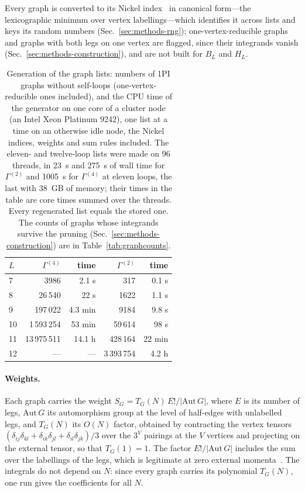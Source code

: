Every graph is converted to its Nickel index~\cite{NMB1977} in canonical form---the
lexicographic minimum over vertex labellings---which identifies it across lists and keys its random numbers
(Sec.~\ref{sec:methods-rng}); one-vertex-reducible graphs and graphs with both legs on one vertex are flagged, since
their integrands vanish (Sec.~\ref{sec:methods-construction}), and are not built for $B_L$ and $H_L$.

\begin{table}
\caption{\label{tab:generation}%
Generation of the graph lists: numbers of 1PI graphs without self-loops (one-vertex-reducible ones included), and the
CPU time of the generator on one core of a cluster node (an Intel Xeon Platinum 9242), one list at a time on an
otherwise idle node, the Nickel indices, weights and sum rules included. The eleven- and twelve-loop lists were made
on 96 threads, in 23~s and 275~s of wall time for $\Gamma^{(2)}$ and 1005~s for $\Gamma^{(4)}$ at eleven loops, the
last with 38~GB of memory; their times in the table are core times summed over the threads. Every regenerated list
equals the stored one. The counts of graphs whose integrands survive the pruning (Sec.~\ref{sec:methods-construction})
are in Table~\ref{tab:graphcounts}.}
\begin{ruledtabular}
\setlength{\tabcolsep}{3pt}\footnotesize
\begin{tabular}{lrrrr}
$L$ & $\Gamma^{(4)}$ & time & $\Gamma^{(2)}$ & time \\
\hline
7  & 3986       & 2.1 s & 317    & 0.1 s \\
8  & 26\,540    & 22 s & 1622   & 1.1 s \\
9  & 197\,022   & 4.3 min & 9184   & 9.8 s \\
10 & 1\,593\,254 & 53 min & 59\,614 & 98 s \\
11 & 13\,975\,511 & 14.1 h & 428\,164 & 22 min \\
12 & --- & --- & 3\,393\,754 & 4.2 h \\
\end{tabular}
\end{ruledtabular}
\end{table}

\paragraph{Weights.}
Each graph carries the weight $S_G=T_G(N)\,E!/|\mathrm{Aut}\,G|$, where $E$ is its number of legs, $\mathrm{Aut}\,G$ its
automorphism group at the level of half-edges with unlabelled legs, and $T_G(N)$ its $O(N)$ factor, obtained by
contracting the vertex tensors $(\delta_{ij}\delta_{kl}+\delta_{ik}\delta_{jl}+\delta_{il}\delta_{jk})/3$ over the $3^V$
pairings at the $V$ vertices and projecting on the external tensor, so that $T_G(1)=1$. The factor $E!/|\mathrm{Aut}\,G|$
includes the sum over the labellings of the legs, which is legitimate at zero external
momenta~\cite{Ribeca2003thesis}. The integrals do not depend on $N$: since every graph carries its polynomial
$T_G(N)$, one run gives the coefficients for all $N$.

